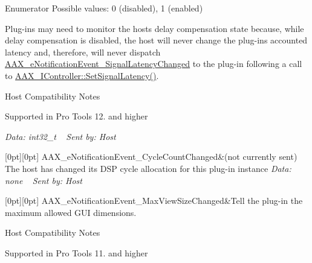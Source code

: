 \begin{DoxyEnumFields}{Enumerator}
Possible values\+: 0 (disabled), 1 (enabled)

Plug-\/ins may need to monitor the host\textquotesingle{}s delay compensation state because, while delay compensation is disabled, the host will never change the plug-\/in\textquotesingle{}s accounted latency and, therefore, will never dispatch \mbox{\hyperlink{a00491_afab5ea2cfd731fc8f163b6caa685406ea06ab4b075ecb523d0dde3ec19b76a756}{A\+A\+X\+\_\+e\+Notification\+Event\+\_\+\+Signal\+Latency\+Changed}} to the plug-\/in following a call to \mbox{\hyperlink{a01789_af2c648879419d94971c1308d8698601f}{A\+A\+X\+\_\+\+I\+Controller\+::\+Set\+Signal\+Latency()}}.

\begin{DoxyRefDesc}{Host Compatibility Notes}
\item[\mbox{\hyperlink{a00786__compatibility_notes000041}{Host Compatibility Notes}}]Supported in Pro Tools 12. and higher\end{DoxyRefDesc}


{\itshape Data\+: {\ttfamily int32\+\_\+t}} ~\newline
 {\itshape Sent by\+: Host} \\
\hline

[0pt][0pt]{}\mbox{\label{a00491_afab5ea2cfd731fc8f163b6caa685406ea0d9204563b32c3275463aaba44002f04}} 
A\+A\+X\+\_\+e\+Notification\+Event\+\_\+\+Cycle\+Count\+Changed&(not currently sent) The host has changed its D\+SP cycle allocation for this plug-\/in instance {\itshape Data\+: none} ~\newline
 {\itshape Sent by\+: Host} \\
\hline

[0pt][0pt]{}\mbox{\label{a00491_afab5ea2cfd731fc8f163b6caa685406ea74ab285136093261fd246572659f119c}} 
A\+A\+X\+\_\+e\+Notification\+Event\+\_\+\+Max\+View\+Size\+Changed&Tell the plug-\/in the maximum allowed G\+UI dimensions. \begin{DoxyRefDesc}{Host Compatibility Notes}
\item[\mbox{\hyperlink{a00786__compatibility_notes000042}{Host Compatibility Notes}}]Supported in Pro Tools 11. and higher\end{DoxyRefDesc}



\end{DoxyEnumFields}
